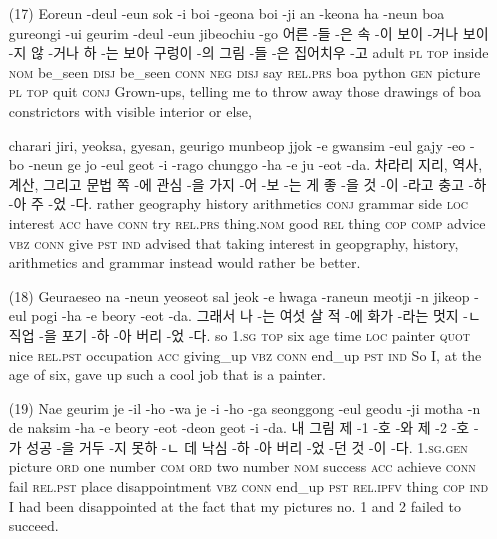 \begin{itemize}
\item [(17)]
\tgl
		{Eoreun -deul -eun sok -i boi -geona boi -ji an -keona ha -neun boa gureongi -ui geurim -deul -eun jibeochiu -go}
		{어른 -들 -은 속 -이 보이 -거나 보이 -지 않 -거나 하 -는 보아 구렁이 -의 그림 -들 -은 집어치우 -고}
		{adult	\textsc{pl}	\textsc{top}	inside	\textsc{nom}	be\_seen	\textsc{disj}	be\_seen	\textsc{conn}	\textsc{neg}	\textsc{disj}	say	\textsc{rel.prs}	boa	python	\textsc{gen}	picture	\textsc{pl}	\textsc{top}	quit	\textsc{conj}}
		{Grown-ups, telling me to throw away those drawings of boa constrictors with visible interior or else,}

\tgl
		{charari jiri, yeoksa, gyesan, geurigo munbeop jjok -e gwansim -eul gajy -eo -bo -neun ge jo -eul geot -i -rago chunggo -ha -e ju -eot -da.}
		{차라리 지리, 역사, 계산, 그리고 문법 쪽 -에 관심 -을 가지 -어 -보 -는 게 좋 -을 것 -이 -라고 충고 -하 -아 주 -었 -다.}
		{rather	geography	history	arithmetics	\textsc{conj}	grammar	side	\textsc{loc}	interest	\textsc{acc}	have	\textsc{conn}	try	\textsc{rel.prs}	thing.\textsc{nom}	good	\textsc{rel}	thing	\textsc{cop}	\textsc{comp}	advice	\textsc{vbz}	\textsc{conn}	give	\textsc{pst}	\textsc{ind}}
		{advised that taking interest in geopgraphy, history, arithmetics and grammar instead would rather be better.}

\item [(18)]
\tgl
		{Geuraeseo na -neun yeoseot sal jeok -e hwaga -raneun meotji -n jikeop -eul pogi -ha -e beory -eot -da.}
		{그래서 나 -는 여섯 살 적 -에 화가 -라는 멋지 -ㄴ 직업 -을 포기 -하 -아 버리 -었 -다.}
		{so	\textsc{1.sg}	\textsc{top}	six	age	time	\textsc{loc} 	painter	\textsc{quot}	nice	\textsc{rel.pst}	occupation	\textsc{acc}	giving\_up	\textsc{vbz}	\textsc{conn}	end\_up	\textsc{pst}	\textsc{ind}}
		{So I, at the age of six, gave up such a cool job that is a painter.}

\item [(19)]
\tgl
		{Nae geurim je -il -ho -wa je -i -ho -ga seonggong -eul geodu -ji motha -n de naksim -ha -e beory -eot -deon geot -i -da.}
		{내 그림 제 -1 -호 -와 제 -2 -호 -가 성공 -을 거두 -지 못하 -ㄴ 데 낙심 -하 -아 버리 -었 -던 것 -이 -다.}
		{\textsc{1.sg.gen}	picture	\textsc{ord}	one	number	\textsc{com} \textsc{ord}	two	number	\textsc{nom}	success	\textsc{acc}	achieve	\textsc{conn}	fail	\textsc{rel.pst}	place	disappointment	\textsc{vbz}	\textsc{conn}	end\_up	\textsc{pst}	\textsc{rel.ipfv}	thing	\textsc{cop}	\textsc{ind}}
		{I had been disappointed at the fact that my pictures no. 1 and 2 failed to succeed.}


\end{itemize}
